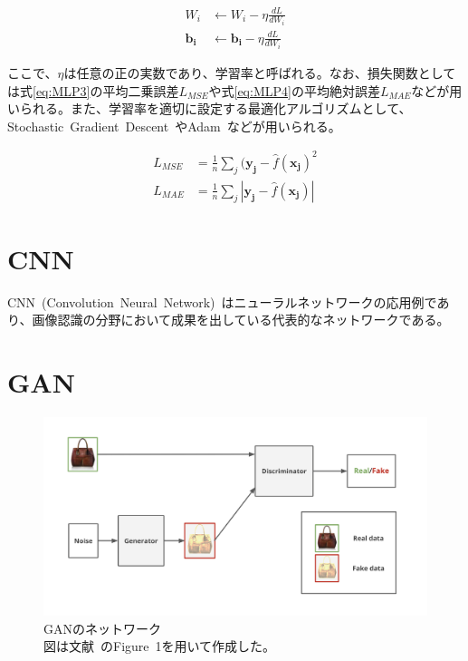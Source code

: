 \begin{align}
    \label{eq:MLP2_0}
    W _i &\leftarrow W_i - \eta \frac{d L}{dW_i} \\
    \label{eq:MLP2_1}
    \boldsymbol{b _i} &\leftarrow \boldsymbol{b_i} - \eta \frac{d L}{dW_i}
\end{align}

ここで、$\eta$は任意の正の実数であり、学習率と呼ばれる。なお、損失関数としては式\ref{eq:MLP3}の平均二乗誤差$L_{MSE}$や式\ref{eq:MLP4}の平均絶対誤差$L_{MAE}$などが用いられる。また、学習率を適切に設定する最適化アルゴリズムとして、Stochastic~Gradient~Descent~\cite{SGD}やAdam~\cite{Adam}などが用いられる。

\begin{align}
    \label{eq:MLP3}
    L_{MSE}&=\frac{1}{n}\sum _{j} {(\boldsymbol{y_j} - \hat{f}(\boldsymbol{x_j})^2}\\
    \label{eq:MLP4}
    L_{MAE}&=\frac{1}{n}\sum _{j} {|\boldsymbol{y_j} - \hat{f}(\boldsymbol{x_j})|}
\end{align}

\section{CNN}

CNN~(Convolution~Neural~Network)~はニューラルネットワークの応用例であり、画像認識の分野において成果を出している代表的なネットワークである。


\section{GAN}

\begin{figure}[b]
\begin{center}
\includegraphics[width=\hsize]{figure/GAN_net.png}
\caption{GANのネットワーク\\
図は文献~\cite{pix2pix}のFigure~1を用いて作成した。}
\label{fig:GAN_net}
\end{center}
\end{figure}

